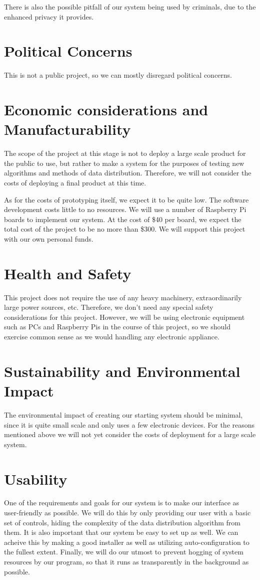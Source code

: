 	There is also the possible pitfall of our system being used by criminals, due to the enhanced privacy it provides.

\section{Political Concerns}
	This is not a public project, so we can mostly disregard political concerns.

\section{Economic considerations and Manufacturability}
	The scope of the project at this stage is not to deploy a large scale product for the public to use, but rather to make a system for the purposes of testing new algorithms and methods of data distribution.  Therefore, we will not consider the costs of deploying a final product at this time.

	As for the costs of prototyping itself, we expect it to be quite low.  The software development costs little to no resources.  We will use a number of Raspberry Pi boards to implement our system.  At the cost of \$40 per board, we expect the total cost of the project to be no more than \$300.  We will support this project with our own personal funds.

\section{Health and Safety}
	This project does not require the use of any heavy machinery, extraordinarily large power sources, etc.  Therefore, we don't need any special safety considerations for this project.  However, we will be using electronic equipment such as PCs and Raspberry Pis in the course of this project, so we should exercise common sense as we would handling any electronic appliance.

\section{Sustainability and Environmental Impact}
	The environmental impact of creating our starting system should be minimal, since it is quite small scale and only uses a few electronic devices.  For the reasons mentioned above we will not yet consider the costs of deployment for a large scale system.

\section{Usability}
	One of the requirements and goals for our system is to make our interface as user-friendly as possible.  We will do this by only providing our user with a basic set of controls, hiding the complexity of the data distribution algorithm from them.  It is also important that our system be easy to set up as well.  We can acheive this by making a good installer as well as utilizing auto-configuration to the fullest extent.  Finally, we will do our utmost to prevent hogging of system resources by our program, so that it runs as transparently in the background as possible.